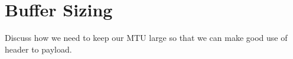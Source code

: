 
\section{Buffer Sizing}
\label{s:buffsize}

Discuss how we need to keep our MTU large so that we can make good use of header to payload.  